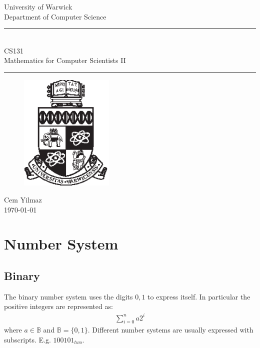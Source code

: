 \documentclass[a4paper]{article}
\theoremstyle{plain}
\theoremstyle{definition}
\newtheorem{defn}{Definition}[section]
\theoremstyle{remark}
\begin{document}
	\begin{titlepage}
	\begin{center}
	\large
	University of Warwick \\
	Department of Computer Science \\
	\huge
	\vspace{50mm}
	\rule{\linewidth}{0.5pt} \\
	CS131 \\
	\vspace{5mm}
	\Large
	Mathematics for Computer Scientists II
	\rule{\linewidth}{0.5pt}
	\vspace{5mm}
	\begin{figure}[H]
	\centering
	\includegraphics[width=0.4\textwidth]{crest_black.eps}
	\end{figure}
	\vspace{37mm}
	Cem Yilmaz \\
	\today
	\end{center}
	\end{titlepage}
	\newpage
	
\section{Number System}
\subsection{Binary}
\begin{tcolorbox}[colback=black!3!white,colframe=black!60!white,title=\begin{defn}Binary number system \label{Binary number system}\end{defn}]
The binary number system uses the digits $0,1$ to express itself. In particular the positive integers are represented as:
\begin{align}
\sum_{i=0}^{n} a2^{i}
\end{align}
where $a \in \mathbb{B}$ and $\mathbb{B} = \{0,1\}$. Different number systems are usually expressed with subscripts. E.g. $100101_{two}$. 
\end{tcolorbox}
\end{document}
